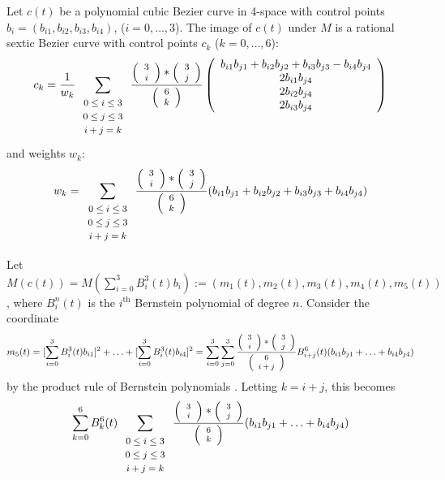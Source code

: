 \begin{theorem}
\label{sextic}
Let $c(t)$ be a polynomial cubic Bezier curve in 4-space with
control points $b_i = (b_{i1},b_{i2},b_{i3},b_{i4})$, ($i=0,\ldots,3$).
The image of $c(t)$ under $M$ is a rational sextic Bezier curve with 
control points $c_k$ ($k = 0, \ldots, 6$):
\begin{equation}
\label{eq:control-pts}
c_k = \frac{1}{w_k} 
      \sum_{\begin{array}{c} \mbox{\footnotesize{$0 \leq i \leq 3$}} \\ 
			     \mbox{\footnotesize{$0 \leq j \leq 3$}} \\ 
			     \mbox{\footnotesize{$i+j=k$}}
			     \end{array}} 
        \frac{\mbox{\footnotesize{$\left( \begin{array}{c} 3 \\ i \end{array} \right)$}} * \mbox{\footnotesize{$\left( \begin{array}{c} 3 \\ j \end{array} \right)$}}}{\mbox{\footnotesize{$\left( \begin{array}{c} 6 \\ k \end{array} \right)$}}}
	\left( \begin{array}{c}
            b_{i1} b_{j1} + b_{i2} b_{j2} + b_{i3} b_{j3} - b_{i4} b_{j4} \\
            2b_{i1} b_{j4} \\
            2b_{i2} b_{j4} \\
            2b_{i3} b_{j4} 
	\end{array} \right)
\end{equation}
and weights $w_k$:
\begin{equation}
\label{eq:weights}
w_k = \sum_{\begin{array}{c} \mbox{\footnotesize{$0 \leq i \leq 3$}} \\ 
			     \mbox{\footnotesize{$0 \leq j \leq 3$}} \\ 
			     \mbox{\footnotesize{$i+j=k$}}
			     \end{array}}
        \frac{\mbox{\footnotesize{$\left( \begin{array}{c} 3 \\ i \end{array} \right)$}} * \mbox{\footnotesize{$\left( \begin{array}{c} 3 \\ j \end{array} \right)$}}}{\mbox{\footnotesize{$\left( \begin{array}{c} 6 \\ k \end{array} \right)$}}}
	(b_{i1} b_{j1} + b_{i2} b_{j2} + b_{i3} b_{j3} + b_{i4} b_{j4})
\end{equation}
\end{theorem}
\prf
Let $M(c(t)) = M(\sum_{i=0}^3 B_i^3(t) b_{i}) 
:= (m_1(t),m_2(t),m_3(t),m_4(t),m_5(t))$, 
where $B_i^n(t)$ is the $i^{\mbox{th}}$ Bernstein polynomial of degree $n$.
Consider the coordinate
\[ m_5(t) =  [\sum_{i=0}^3 B_i^3(t) b_{i1}]^2 + 
	\ldots + [\sum_{i=0}^3 B_i^3(t) b_{i4}]^2
     =   \sum_{i=0}^3 \sum_{j=0}^3 
	\frac{\mbox{\footnotesize{$\left( \begin{array}{c} 3 \\ i \end{array} \right)$}} * \mbox{\footnotesize{$\left( \begin{array}{c} 3 \\ j \end{array} \right)$}}}{\mbox{\footnotesize{$\left( \begin{array}{c} 6 \\ i+j \end{array} \right)$}}}
       B^6_{i+j}(t) (b_{i1} b_{j1} + \ldots + b_{i4} b_{j4})
\]
by the product rule of Bernstein polynomials \cite{farin93}.
Letting $k=i+j$, this becomes
\[ \sum_{k=0}^6 B_k^6(t) 
	\sum_{\begin{array}{c}  \mbox{\footnotesize{$0 \leq i \leq 3$}} \\ 
			     \mbox{\footnotesize{$0 \leq j \leq 3$}} \\ 
			     \mbox{\footnotesize{$i+j=k$}}
			     \end{array}} 
	\frac{\mbox{\scriptsize{$\left( \begin{array}{c} 3 \\ i \end{array} \right)$}} * \mbox{\scriptsize{$\left( \begin{array}{c} 3 \\ j \end{array} \right)$}}}{\mbox{\scriptsize{$\left( \begin{array}{c} 6 \\ k \end{array} \right)$}}}
	(b_{i1} b_{j1} + \ldots + b_{i4} b_{j4}) \]
